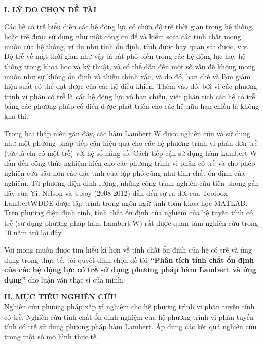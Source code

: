 \documentclass[12pt,oneside,portrait,a4paper]{book}
\theoremstyle{definition}
\theoremstyle{plain}
\begin{document}
\noindent 
\textbf{ I. LÝ DO CHỌN ĐỀ TÀI}\\
\hspace*{0,5cm}

Các hệ có trễ biểu diễn các hệ động lực có chứa độ trễ thời gian trong hệ thống, hoặc trễ được sử dụng như một công cụ để và kiểm soát các tính chất mong muốn của hệ thống, ví dụ như tính ổn định, tính được hay quan sát được, v.v. Độ trễ về mặt thời gian như vậy là rất phổ biến trong các hệ động lực hay hệ thống trong khoa học và kỹ thuật, và có thể dẫn đến một số vấn đề không mong muốn như sự không ổn định và thiếu chính xác, và do đó, hạn chế và làm giảm hiệu suất có thể đạt được của các hệ điều khiển. Thêm vào đó, bởi vì các phương trình vi phân có trễ là các hệ động lực vô hạn chiều, việc phân tích các hệ có trễ bằng các phương pháp cổ điển được phát triển cho các hệ hữu hạn chiều là không khả thi.

Trong hai thập niên gần đây, các hàm Lambert W được nghiên cứu và sử dụng như một phương pháp tiếp cận hiệu quả cho các hệ phương trình vi phân đơn trễ (tức là chỉ có một trễ) với hệ số hằng số. 
Cách tiếp cận sử dụng hàm Lambert W dẫn đến công thức nghiệm hiển cho các phương trình vi phân có trễ và cho phép nghiên cứu sâu hơn các đặc tính của tập phổ cũng như tính chất ổn định của nghiệm. Từ phương diện định lượng, những công trình nghiên cứu tiên phong gần đây của Yi, Nelson và Ulsoy (2008-2012) dẫn đến sự ra đời của Toolbox LambertWDDE được lập trình trong ngôn ngữ tính toán khoa học MATLAB. Trên phương diện định tính, tính chất ổn định của nghiệm của hệ tuyến tính có trễ (sử dụng phương pháp hàm Lambert W) rất được quan tâm nghiên cứu trong 10 năm trở lại đây.

Với mong muốn được tìm hiểu kĩ hơn về tính chất ổn định của hệ có trễ và ứng dụng trong thực tế, tôi quyết định chọn đề tài \textbf{``Phân tích tính chất ổn định của các hệ động lực có trễ sử dụng phương pháp hàm Lambert và ứng dụng''} cho luận văn thạc sĩ của mình. 

\vspace{6pt}
\noindent 
\textbf{ II. MỤC TIÊU NGHIÊN CỨU}\\
\hspace*{0,5cm} Nghiên cứu phương pháp xấp xỉ nghiệm cho hệ phương trình vi phân tuyến tính có trễ. 
Nghiên cứu tính chất ổn định nghiệm của hệ phương trình vi phân tuyến tính có trễ sử dụng phương pháp hàm Lambert. 
Áp dụng các kết quả nghiên cứu trong một số mô hình thực tế.   
\end{document}
